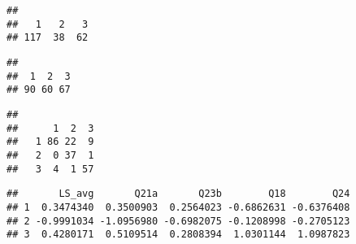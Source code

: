 \documentclass[
]{article}
\newenvironment{Shaded}{\begin{snugshade}}{\end{snugshade}}
\newcommand{\FunctionTok}[1]{\textcolor[rgb]{0.00,0.00,0.00}{#1}}
\newcommand{\NormalTok}[1]{#1}
\newcommand{\OtherTok}[1]{\textcolor[rgb]{0.56,0.35,0.01}{#1}}
\newcommand{\SpecialCharTok}[1]{\textcolor[rgb]{0.00,0.00,0.00}{#1}}
\begin{document}
\begin{verbatim}
## 
##   1   2   3 
## 117  38  62
\end{verbatim}

\begin{Shaded}
\end{Shaded}

\begin{verbatim}
## 
##  1  2  3 
## 90 60 67
\end{verbatim}

\begin{Shaded}
\end{Shaded}

\begin{verbatim}
##    
##      1  2  3
##   1 86 22  9
##   2  0 37  1
##   3  4  1 57
\end{verbatim}

\begin{Shaded}
\end{Shaded}

\begin{verbatim}
##       LS_avg       Q21a       Q23b        Q18        Q24
## 1  0.3474340  0.3500903  0.2564023 -0.6862631 -0.6376408
## 2 -0.9991034 -1.0956980 -0.6982075 -0.1208998 -0.2705123
## 3  0.4280171  0.5109514  0.2808394  1.0301144  1.0987823
\end{verbatim}
\end{document}
